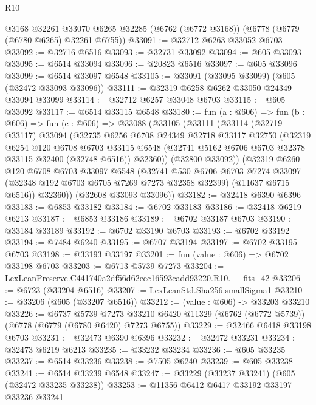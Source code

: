 \begin{lexlean}{R10}
\begin{coremodule}
    @3168
    @32261
    @33070
    @6265
    @32285
    (@6762 (@6772 @3168))
    (@6778 (@6779 (@6780 @6265) @32261 @6755))
@33091 := @32712 @6263 @33052 @6703
@33092 := @32716 @6516
@33093 := @32731 @33092
@33094 := @605 @33093
@33095 := @6514 @33094
@33096 := @20823 @6516
@33097 := @605 @33096
@33099 := @6514 @33097 @6548
@33105 := @33091 (@33095 @33099) (@605 (@32472 @33093 @33096))
@33111 := @32319 @6258 @6262 @33050 @24349 @33094 @33099
@33114 := @32712 @6257 @33048 @6703
@33115 := @605 @33092
@33117 := @6514 @33115 @6548
@33180 := fun (a : @606) =>
  fun (b : @606) =>
  fun (c : @606) =>
  @33088
    (@33105
      (@33111
        (@33114
          (@32719 @33117)
          @33094
          (@32735
            @6256
            @6708
            @24349
            @32718
            @33117
            @32750
            (@32319
              @6254
              @120
              @6708
              @6703
              @33115
              @6548
              (@32741 @5162 @6706 @6703 @32378 @33115 @32400 (@32748 @6516))
              @32360))
          (@32800 @33092))
        (@32319
          @6260
          @120
          @6708
          @6703
          @33097
          @6548
          (@32741
            @530
            @6706
            @6703
            @7274
            @33097
            (@32348 @192 @6703 @6705 @7269 @7273 @32358 @32399)
            (@11637 @6715 @6516))
          @32360))
      (@32608 @33093 @33096))
@33182 := @32418 @6390 @6396
@33183 := @6853 @33182
@33184 := @6702 @33183
@33186 := @32418 @6219 @6213
@33187 := @6853 @33186
@33189 := @6702 @33187 @6703
@33190 := @33184 @33189
@33192 := @6702 @33190 @6703
@33193 := @6702 @33192
@33194 := @7484 @6240
@33195 := @6707 @33194
@33197 := @6702 @33195 @6703
@33198 := @33193 @33197
@33201 := fun (value : @606) => @6702 @33198 @6703
@33203 := @6713 @5739 @7273
@33204 := LexLeanPreserve.C441740a2df56d62eec16593cadd93220.R10.__fits_42
@33206 := @6723 (@33204 @6516)
@33207 := LexLeanStd.Sha256.smallSigma1
@33210 := @33206 (@605 (@33207 @6516))
@33212 := (value : @606) -> @33203 @33210
@33226 := @6737
    @5739
    @7273
    @33210
    @6420
    @11329
    (@6762 (@6772 @5739))
    (@6778 (@6779 (@6780 @6420) @7273 @6755))
@33229 := @32466 @6418 @33198 @6703
@33231 := @32473 @6390 @6396
@33232 := @32472 @33231
@33234 := @32473 @6219 @6213
@33235 := @33232 @33234
@33236 := @605 @33235
@33237 := @6514 @33236
@33238 := @7505 @6240
@33239 := @605 @33238
@33241 := @6514 @33239 @6548
@33247 := @33229 (@33237 @33241) (@605 (@32472 @33235 @33238))
@33253 := @11356 @6412 @6417 @33192 @33197 @33236 @33241

\end{coremodule}
\end{lexlean}
